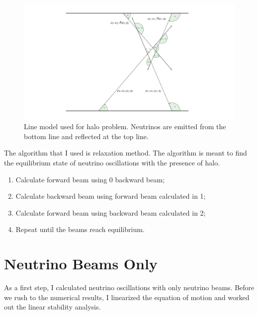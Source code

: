 \begin{figure}
    \centering
    \includegraphics[width=\textwidth]{chapters/assets/halo/line-model.pdf}
    \caption{Line model used for halo problem. Neutrinos are emitted from the bottom line and reflected at the top line.}
    \label{chap:halo-sec:line-fig:line-model}
\end{figure}


The algorithm that I used is relaxation method. The algorithm is meant to find the equilibrium state of neutrino oscillations with the presence of halo.
\begin{enumerate}
\item Calculate forward beam using 0 backward beam;
\item Calculate backward beam using forward beam calculated in 1;
\item Calculate forward beam using backward beam calculated in 2;
\item Repeat until the beams reach equilibrium.
\end{enumerate}


\section{\label{chap:halo-sec:line-sym}Neutrino Beams Only}

As a first step, I calculated neutrino oscillations with only neutrino beams. Before we rush to the numerical results, I linearized the equation of motion and worked out the linear stability analysis.

